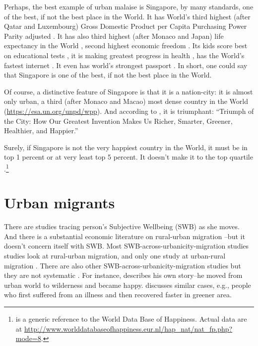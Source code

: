 \documentclass[10pt, letterpaper]{article}
\begin{document}
\begin{spacing}{2.0}
Perhaps, the best example of urban malaise is Singapore, by many standards, one of the
best, if not the best place in the World. It has World's third highest (after
Qatar and Luxembourg) Gross Domestic Product per Capita Purchasing Power Parity
adjusted \citep{authorNYT17monD}. It has also third highest (after Monaco and
Japan) life expectancy in the World \citep{cia},
second highest economic freedom \citep{heritage}. Its kids score best on educational
tests \citep{coughlanBBC17dec6}, it is making greatest progress in health
\citep{fullman2017measuring}, has the World's fastest internet \citep{mcspaddenNYT17monD}.
 It even has world's strongest passport
\citep{chandranCNBC17oct24}. In short, one could say that Singapore %
 is one of the best, if not the best place in the World.  

Of course, a distinctive feature of Singapore is that it is a nation-city: it is
 almost only  urban, a third %
{(after Monaco and Macao)} most dense country in the World
 (\url{https://esa.un.org/unpd/wpp}). And according to \citet{glaeser11}, it is triumphant:
``Triumph of the City: How Our Greatest Invention Makes Us Richer, Smarter,
Greener, Healthier, and Happier.'' 

Surely, if Singapore is not the very happiest country in the World, it must be in
top 1 percent or at very least top 5 percent. It doesn't make it to the top
quartile \citep{veenhoven95b}.\footnote{\citet{veenhoven95b} is a generic reference to the World Data Base of Happiness. Actual data are at \url{http://www.worlddatabaseofhappiness.eur.nl/hap_nat/nat_fp.php?mode=8}.}

\section*{Urban migrants}

There are  studies tracing person's Subjective Wellbeing (SWB) as she moves.
 And there is a substantial economic literature on rural-urban migration %
 \citep[e.g.,][]{lall06al}--but it doesn't concern itself with SWB.  
 Most SWB-across-urbanicity-migration studies studies look at rural-urban migration, and only one study at urban-rural
migration \citep{alcock14}. %
%
There are also other SWB-across-urbanicity-migration studies  but
  they are not systematic%
. For instance, \citet{tesson13}
  describes his own story--he moved from urban world to wilderness and became
  happy. \citet{pretty12} discusses similar  cases, e.g., people who first
  suffered from an illness and then recovered faster in greener area. 



\end{spacing}
\end{document}
